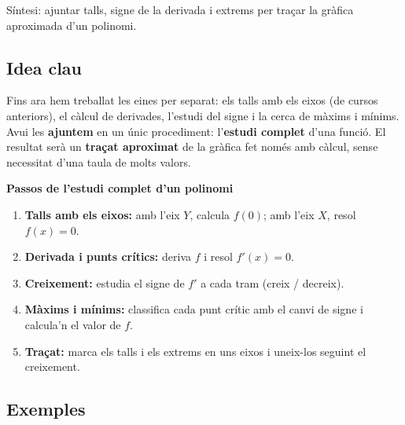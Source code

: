 %
{Síntesi: ajuntar talls, signe de la derivada i extrems per traçar la gràfica aproximada d'un polinomi.}

\subsection{Idea clau}

Fins ara hem treballat les eines per separat: els talls amb els eixos (de cursos
anteriors), el càlcul de derivades, l'estudi del signe i la cerca de màxims i mínims.
Avui les \textbf{ajuntem} en un únic procediment: l'\textbf{estudi complet} d'una
funció. El resultat serà un \textbf{traçat aproximat} de la gràfica fet només amb
càlcul, sense necessitat d'una taula de molts valors.

\begin{idea}
\textbf{Passos de l'estudi complet d'un polinomi}
\begin{enumerate}[leftmargin=1.6em, itemsep=2pt]
  \item \textbf{Talls amb els eixos:} amb l'eix $Y$, calcula $f(0)$; amb l'eix $X$,
        resol $f(x)=0$.
  \item \textbf{Derivada i punts crítics:} deriva $f$ i resol $f'(x)=0$.
  \item \textbf{Creixement:} estudia el signe de $f'$ a cada tram (creix / decreix).
  \item \textbf{Màxims i mínims:} classifica cada punt crític amb el canvi de signe i
        calcula'n el valor de $f$.
  \item \textbf{Traçat:} marca els talls i els extrems en uns eixos i uneix-los seguint
        el creixement.
\end{enumerate}
\end{idea}

\subsection{Exemples}

